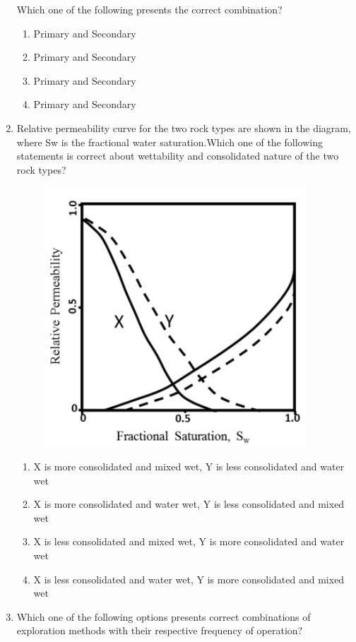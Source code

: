 \documentclass[journal,12pt,onecolumn]{IEEEtran}
\theoremstyle{remark}
\begin{document}
\begin{enumerate}
\noindent
Which one of the following presents the correct combination?


\begin{enumerate} 
\item Primary and Secondary
\item Primary and Secondary 
\item Primary and Secondary 
\item Primary and Secondary 
\end{enumerate}

\item Relative permeability curve for the two rock types  are shown in the diagram, where Sw is the fractional water saturation.Which one of the following statements is correct about wettability and consolidated nature of the two rock types?

\hfill{}

\begin{figure}[h!]
  \centering
  \includegraphics[width=0.3\columnwidth]{figs/pic11.png} 
   \caption*{}
  \label{fig:Q45}
\end{figure}

\begin{enumerate} 
\item X is more consolidated and mixed wet, Y is less consolidated and water wet
\item X is more consolidated and water wet, Y is less consolidated and mixed wet
\item X is less consolidated and mixed wet, Y is more consolidated and water wet
\item X is less consolidated and water wet, Y is more consolidated and mixed wet\\
\end{enumerate}

\pagebreak

\item Which one of the following options presents correct combinations of exploration methods with their respective frequency of operation? 


\end{enumerate}
\end{document}
